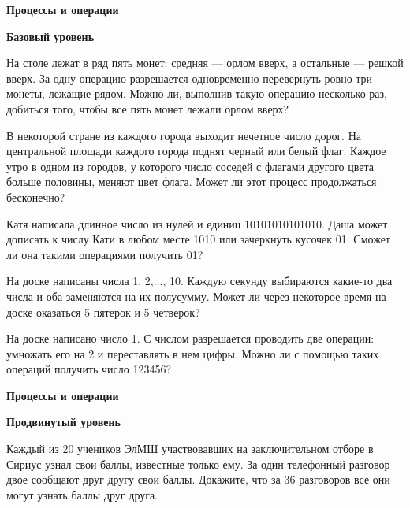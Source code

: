 \hspace{3mm}

\centerline{\bf \Huge Процессы и операции}

\centerline{\bf \large Базовый уровень}

\begin{flushright}
        \scriptsize{}
\end{flushright}




На столе лежат в ряд пять монет: средняя --- орлом вверх, а остальные --- решкой вверх. За одну операцию разрешается одновременно перевернуть ровно три монеты, лежащие рядом. Можно ли, выполнив такую операцию несколько раз, добиться того, чтобы все пять монет лежали орлом вверх?

В некоторой стране из каждого города выходит нечетное число дорог. На центральной площади каждого города поднят черный или белый флаг. Каждое утро в одном из городов, у которого число соседей с флагами другого цвета больше половины, меняют цвет флага. Может ли этот процесс продолжаться бесконечно?

Катя написала длинное число из нулей и единиц 10101010101010. Даша может дописать к числу Кати в любом месте 1010 или зачеркнуть кусочек 01. Сможет ли она такими операциями получить 01?

На доске написаны числа 1, 2,..., 10. Каждую секунду выбираются какие-то два числа и оба заменяются на их полусумму. Может ли через некоторое время на доске оказаться 5 пятерок и 5 четверок?

На доске написано число 1. С числом разрешается проводить две операции: умножать его на 2 и переставлять в нем цифры. Можно ли с помощью таких операций получить число 123456?



\newpage

\hspace{3mm}

\centerline{\bf \Huge Процессы и операции}

\centerline{\bf \large Продвинутый уровень}

\begin{flushright}
        \scriptsize{}
\end{flushright}

Каждый из 20 учеников ЭлМШ участвовавших на заключительном отборе в Сириус узнал свои баллы, известные только ему. За один телефонный разговор двое сообщают друг другу свои баллы. Докажите, что за 36 разговоров все они могут узнать баллы друг друга.


